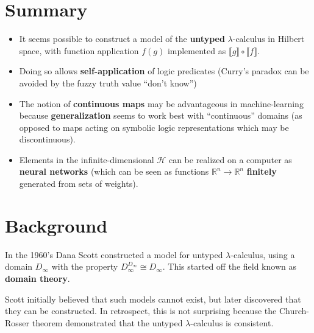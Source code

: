\maketitle

\section*{Summary}
\begin{itemize}
	\item It seems possible to construct a model of the \textbf{untyped} $\lambda$-calculus in Hilbert space, with function application $f(g)$ implemented as $\llbracket g \rrbracket \circ \llbracket f \rrbracket$.
	
	\item Doing so allows \textbf{self-application} of logic predicates (Curry's paradox can be avoided by the fuzzy truth value ``don't know'')
	
	\item The notion of \textbf{continuous maps} may be advantageous in machine-learning because \textbf{generalization} seems to work best with ``continuous'' domains (as opposed to maps acting on symbolic logic representations which may be discontinuous).

	\item Elements in the infinite-dimensional $\mathcal{H}$ can be realized on a computer as \textbf{neural networks} (which can be seen as functions $\mathbb{R}^n \rightarrow \mathbb{R}^n$ \textbf{finitely} generated from sets of weights).
\end{itemize}


\setcounter{section}{-1}
\section{Background}

In the 1960's Dana Scott constructed a model for untyped $\lambda$-calculus, using a domain $D_{\infty}$ with the property $D_{\infty}^{D_{\infty}} \cong D_{\infty}$.  This started off the field known as \textbf{domain theory}.

Scott initially believed that such models cannot exist, but later discovered that they can be constructed.  In retrospect, this is not surprising because the Church-Rosser theorem demonstrated that the untyped $\lambda$-calculus is consistent.

